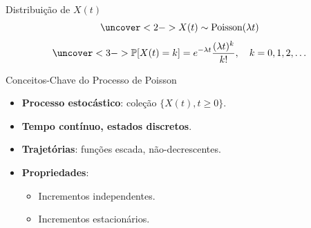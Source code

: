 \documentclass{beamer}
\begin{document}
\begin{frame}{Distribuição de $X(t)$}
\[
\uncover<2->{X(t) \sim \text{Poisson}(\lambda t)}
\]
\[
\uncover<3->{\mathbb{P}[X(t) = k] = e^{-\lambda t} \frac{(\lambda t)^k}{k!}, 
\quad k = 0,1,2,\dots}
\]

\pause
\begin{center}
\end{center}
\end{frame}

\begin{frame}{Conceitos-Chave do Processo de Poisson}
\begin{itemize}
  \item<1-> \textbf{Processo estocástico}: coleção $\{X(t), t \geq 0\}$.
  \item<2-> \textbf{Tempo contínuo, estados discretos}.
  \item<3-> \textbf{Trajetórias}: funções escada, não-decrescentes.
  \item<4-> \textbf{Propriedades}:
    \begin{itemize}
      \item<5-> Incrementos independentes.
      \item<6-> Incrementos estacionários.
    \end{itemize}
\end{itemize}
\end{frame}
\end{document}
